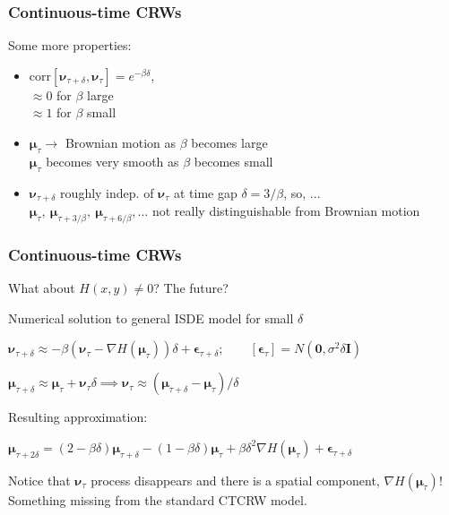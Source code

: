 \documentclass[36pt,handout]{beamer}
\newcommand{\ft}[1]{\frametitle{#1}}
\newcommand{\bigsep}{\itemsep=1.5\baselineskip}
\newcommand{\bmu}{\boldsymbol{\mu}}
\newcommand{\be}{\boldsymbol{\epsilon}}
\newcommand{\bv}{\boldsymbol{\nu}}
\begin{document}
\begin{frame}
\ft{Continuous-time CRWs}
Some more properties: 
\medskip

\begin{itemize}
\bigsep
\item $\mbox{corr}[\bv_{\tau+\delta},\bv_\tau] = e^{-\beta\delta}$,\\
$\approx 0$ for $\beta$ large\\
$\approx 1$ for $\beta$ small
\pause
\item $\bmu_\tau \to$ Brownian motion as $\beta$ becomes large\\
$\bmu_\tau$ becomes very smooth as $\beta$ becomes small
\pause
\item $\bv_{\tau+\delta}$ roughly indep. of $\bv_\tau$ at time gap $\delta = 3/\beta$, so, ...\medskip \\
$\bmu_\tau,\ \bmu_{\tau+3/\beta},\ \bmu_{\tau+6/\beta},\dots$ not really distinguishable from Brownian motion
\end{itemize}
\vfill
\end{frame}


\begin{frame}
\ft{Continuous-time CRWs}
What about $H(x,y) \ne 0$? The future?
\medskip

\pause

\begin{block}{Numerical solution to general ISDE model}
for small $\delta$

$\bv_{\tau+\delta} \approx -\beta(\bv_\tau - \nabla H(\bmu_\tau) )\delta + \be_{\tau+\delta};\qquad [\be_{\tau}]=N(\mathbf{0},\sigma^2\delta\mathbf{I})$
\medskip

$\bmu_{\tau+\delta} \approx \bmu_\tau + \bv_\tau \delta \implies \bv_\tau \approx (\bmu_{\tau+\delta}-\bmu_\tau)/\delta$
\bigskip

Resulting approximation:

$
\bmu_{\tau+2\delta} = (2-\beta\delta)\bmu_{\tau+\delta} -  (1-\beta\delta)\bmu_\tau + \beta\delta^2 \nabla H(\bmu_\tau) + \be_{\tau+\delta}
$
\end{block}
\medskip

\pause

Notice that $\bv_\tau$ process disappears and there is a spatial component, $\nabla H(\bmu_\tau)$! Something missing from the standard CTCRW model.


\end{frame}


\end{document}

